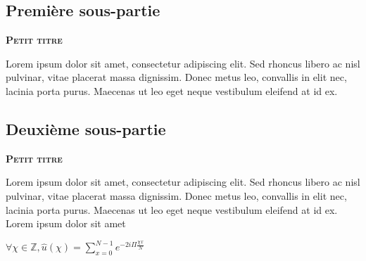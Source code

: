 \documentclass{article}
\begin{document}
\subsection{Première sous-partie}
\textbf{\textsc{Petit titre}}

Lorem ipsum dolor sit amet, consectetur adipiscing elit. Sed rhoncus libero ac nisl pulvinar, 
vitae placerat massa dignissim. Donec metus leo, convallis in elit nec, lacinia porta purus. 
Maecenas ut leo eget neque vestibulum eleifend at id ex. 

\subsection{Deuxième sous-partie}
\textbf{\textsc{Petit titre}}

Lorem ipsum dolor sit amet, consectetur adipiscing elit. Sed rhoncus libero ac nisl pulvinar, 
vitae placerat massa dignissim. Donec metus leo, convallis in elit nec, lacinia porta purus. 
Maecenas ut leo eget neque vestibulum eleifend at id ex. \newline\newline
Lorem ipsum dolor sit amet\newline


$\forall \chi \in \mathbb{Z}, \hat{u}(\chi) = \sum_{x=0}^{N-1} e^{-2i\Pi\frac{\chi x}{N}}$

% 


\end{document}
